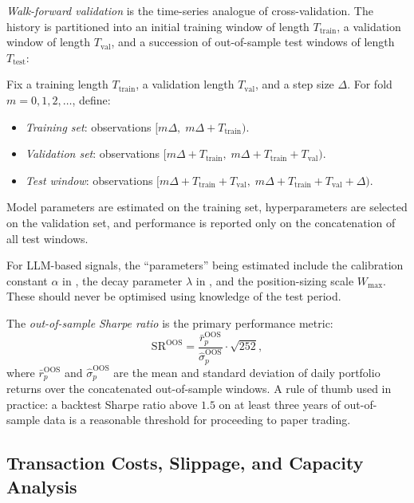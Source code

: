 \emph{Walk-forward validation} is the time-series analogue of cross-validation. The
history is partitioned into an initial training window of length $T_{\text{train}}$, a
validation window of length $T_{\text{val}}$, and a succession of out-of-sample test
windows of length $T_{\text{test}}$:

\begin{definition}
\label{def:walk-forward}
Fix a training length $T_{\text{train}}$, a validation length $T_{\text{val}}$, and a
step size $\Delta$. For fold $m = 0, 1, 2, \ldots$, define:
\begin{itemize}
  \item \emph{Training set}: observations $[m\Delta,\; m\Delta + T_{\text{train}})$.
  \item \emph{Validation set}: observations $[m\Delta + T_{\text{train}},\;
        m\Delta + T_{\text{train}} + T_{\text{val}})$.
  \item \emph{Test window}: observations $[m\Delta + T_{\text{train}} + T_{\text{val}},\;
        m\Delta + T_{\text{train}} + T_{\text{val}} + \Delta)$.
\end{itemize}
Model parameters are estimated on the training set, hyperparameters are selected on
the validation set, and performance is reported only on the concatenation of all
test windows.
\end{definition}

For LLM-based signals, the ``parameters'' being estimated include the calibration
constant $\alpha$ in , the decay parameter
$\lambda$ in , and the position-sizing
scale $W_{\max}$. These should never be optimised using knowledge of the test period.

The \emph{out-of-sample Sharpe ratio} is the primary performance metric:
\begin{equation}
  \text{SR}^{\text{OOS}} = \frac{\bar{r}_p^{\text{OOS}}}{\hat{\sigma}_p^{\text{OOS}}}
  \cdot \sqrt{252},
  \label{eq:ch10-oos-sharpe}
\end{equation}
where $\bar{r}_p^{\text{OOS}}$ and $\hat{\sigma}_p^{\text{OOS}}$ are the mean and
standard deviation of daily portfolio returns over the concatenated out-of-sample windows.
A rule of thumb used in practice: a backtest Sharpe ratio above $1.5$ on at least three
years of out-of-sample data is a reasonable threshold for proceeding to paper trading.

\subsection{Transaction Costs, Slippage, and Capacity Analysis}
\label{sec:ch10-transaction-costs}


